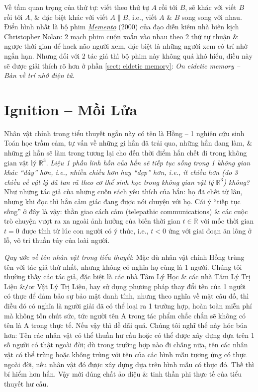 \documentclass[12pt,twoside]{book}
\begin{document}
Về tầm quan trọng của thứ tự: viết theo thứ tự $A$ rồi tới $B$, sẽ khác với viết $B$ rồi tới $A$, \& đặc biệt khác với viết $A\parallel B$, i.e., viết $A$ \& $B$ song song với nhau. Điển hình nhất là bộ phim \href{https://www.imdb.com/title/tt0209144/}{\it Memento} (2000) của đạo diễn kiêm nhà biên kịch {\sc Christopher Nolan}: 2 mạch phim cuộn xoắn vào nhau theo 2 thứ tự thuận \& ngược thời gian để hack não người xem, đặc biệt là những người xem có trí nhớ ngắn hạn. Nhưng đối với 2 tác giả thì bộ phim này không quá khó hiểu, điều này sẽ được giải thích rõ hơn ở phần \ref{sect: eidetic memory}: {\it On eidetic memory -- Bàn về trí nhớ điện tử}.

\chapter{Ignition -- Mồi Lửa}
\minitoc
Nhân vật chính trong tiểu thuyết ngắn này có tên là {\sf Hồng} -- 1 nghiên cứu sinh Toán học trầm cảm, tự vấn về những gì hắn đã trải qua, những hắn đang làm, \& những gì hắn sẽ làm trong tương lại cho đến thời điểm hắn chết đi trong không gian vật lý $\mathbb{R}^3$. {\it Liệu 1 phần linh hồn của hắn sẽ tiếp tục sống trong 1 không gian khác ``dày'' hơn, i.e., nhiều chiều hơn hay ``dẹp'' hơn, i.e., ít chiều hơn (do 3 chiều về vật lý đã tan rã theo cơ thể sinh học trong không gian vật lý $\mathbb{R}^3$) không?} Như những tác giả của những cuốn sách yêu thích của hắn: họ đã chết từ lâu, nhưng khi đọc thì hắn cảm giác đang được nói chuyện với họ. Cái ý ``tiếp tục sống'' ở đây là vậy: thần giao cách cảm (telepathic communications) \& các cuộc trò chuyện vượt ra xa ngoài ảnh hưởng của biến thời gian $t\in\mathbb{R}$ với mốc thời gian $t = 0$ được tính từ lúc con người có ý thức, i.e., $t < 0$ ứng với giai đoạn ăn lông ở lỗ, vô tri thuần túy của loài người.

{\it Quy ước về tên nhân vật trong tiểu thuyết}: Mặc dù nhân vật chính {\sf Hồng} trùng tên với tác giả thứ nhất, nhưng không có nghĩa họ cùng là 1 người. Chúng tôi thường thấy các tác giả, đặc biệt là các nhà Tâm Lý Học \& các nhà Tâm Lý Trị Liệu \&{\tt/}or Vật Lý Trị Liệu, hay sử dụng phương pháp thay đổi tên của 1 người có thực để đảm bảo sự bảo mật danh tính, nhưng theo nghĩa về mặt câu đố, thì điều đó có nghĩa là người giải đã có thể loại ra 1 trường hợp, hoàn toàn miễn phí mà không tốn chút sức, tức người tên {\sf A} trong tác phẩm chắc chắn sẽ không có tên là {\sf A} trong thực tế. Nếu vậy thì dễ dãi quá. Chúng tôi nghĩ thế này hóc búa hơn: Tên các nhân vật có thể thuần hư cấu hoặc có thể được xây dựng dựa trên 1 số người có thật ngoài đời; dù trong trường hợp nào đi chăng nữa, tên các nhân vật có thể trùng hoặc không trùng với tên của các hình mẫu tương ứng có thực ngoài đời, nếu nhân vật đó được xây dựng dựa trên hình mẫu có thực đó. Thế thì bí hiểm hơn hẳn. Vậy mới đúng chất ảo diệu \& tinh thần phi thực tế của tiểu thuyết hư cấu.
\end{document}
